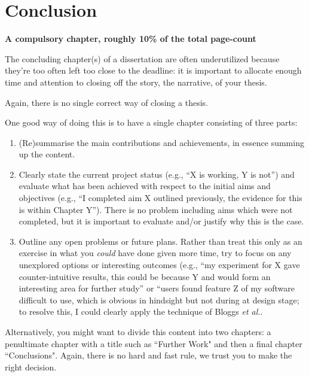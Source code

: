 \documentclass{dissertation}
\begin{document}

\chapter{Conclusion}
\label{chap:conclusion}

{\bf A compulsory chapter,  roughly 10\% of the total page-count}
\vspace{1cm} 

\noindent
The concluding chapter(s) of a dissertation are often underutilized because they're 
too often left too close to the deadline: it is important to allocate enough time and 
attention to closing off the story, the narrative, of your thesis.

Again, there is no single correct way of closing a thesis. 

One good way of doing this is to have a single chapter consisting of three parts:

\begin{enumerate}
\item (Re)summarise the main contributions and achievements, in essence
      summing up the content.
\item Clearly state the current project status (e.g., ``X is working, Y 
      is not'') and evaluate what has been achieved with respect to the 
      initial aims and objectives (e.g., ``I completed aim X outlined 
      previously, the evidence for this is within Chapter Y'').  There 
      is no problem including aims which were not completed, but it is 
      important to evaluate and/or justify why this is the case.
\item Outline any open problems or future plans.  Rather than treat this
      only as an exercise in what you {\em could} have done given more 
      time, try to focus on any unexplored options or interesting outcomes
      (e.g., ``my experiment for X gave counter-intuitive results, this 
      could be because Y and would form an interesting area for further 
      study'' or ``users found feature Z of my software difficult to use,
      which is obvious in hindsight but not during at design stage; to 
      resolve this, I could clearly apply the technique of Bloggs {\em et al.}.
\end{enumerate}

Alternatively, you might want to divide this content into two chapters: a penultimate chapter with a title such as ``Further Work" and then a final chapter ``Conclusions". Again, there is no hard and fast rule, we trust you to make the right decision. 
\end{document}
